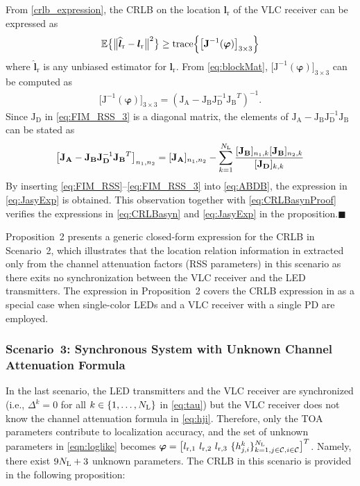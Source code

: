 \documentclass[10pt,twocolumn]{IEEEtran}
\newcommand{\NL}{N_{\rm{L}}}
\newcommand{\bvp}{{\boldsymbol{\varphi}}}
\newcommand{\mtC}{{\mathcal{C}}}
\newcommand{\expectation}{{\mathbb{E}}}
\newcommand{\lr}{{\boldsymbol{l}_{\mathrm{r}}}}
\newcommand{\lrh}{{\widehat{\boldsymbol{l}}_{\mathrm{r}}}}
\newcommand{\lrs}[1]{{l_{\mathrm{r},#1}}}
\newcommand{\Jvi}{{\boldsymbol{\mathrm{J}}^{-1}(\bvp)}}
\newcommand{\JA}{{\boldsymbol{\mathrm{J_A}}}}
\newcommand{\JB}{{\boldsymbol{\mathrm{J_B}}}}
\newcommand{\JD}{{\boldsymbol{\mathrm{J_D}}}}
\newcommand{\JDi}{{\boldsymbol{\mathrm{J}}}_{\boldsymbol{\mathrm{D}}}^{-1}}
\begin{document}
From \eqref{crlb_expression}, the CRLB on the location $\lr$ of the VLC receiver can be expressed as \cite{Poor}
\begin{gather}\label{eq:CRLBasynProof}
	\expectation \big\{ \big\|\lrh - \lr \big\|^2 \big\}\geq{\rm{trace}}\Big\{\big[\Jvi\big]_{3\times3}\Big\}
\end{gather}
where $\lrh$ is any unbiased estimator for $\lr$. From \eqref{eq:blockMat}, $\big[\Jvi\big]_{3\times3}$ can be computed as
\begin{gather}\label{eq:blockInv}
	\big[\Jvi\big]_{3\times3}=\left(\JA-\JB\JDi\JB^T\right)^{-1}.
\end{gather}
Since $\JD$ in \eqref{eq:FIM_RSS_3} is a diagonal matrix, the elements of $\JA-\JB\JDi\JB$ can be stated as
\begin{gather}\label{eq:ABDB}	\big[\JA-\JB\JDi\JB^T\big]_{n_1,n_2}=[\JA]_{n_1,n_2}-\sum_{k=1}^{\NL}\frac{[\JB]_{n_1,k}[\JB]_{n_2,k}}{[\JD]_{k,k}}
\end{gather}
By inserting \eqref{eq:FIM_RSS}--\eqref{eq:FIM_RSS_3} into \eqref{eq:ABDB}, the expression in \eqref{eq:JasyExp} is obtained. This observation together with \eqref{eq:CRLBasynProof} verifies the expressions in \eqref{eq:CRLBasyn} and \eqref{eq:JasyExp} in the proposition.\hfill$\blacksquare$

Proposition~2 presents a generic closed-form expression for the CRLB in Scenario~2, which illustrates that the location relation information in extracted only from the channel attenuation factors (RSS parameters) in this scenario as there exits no synchronization between the VLC receiver and the LED transmitters. The expression in Proposition~2 covers the CRLB expression in \cite[Prop.~3]{Direct_TCOM} as a special case when single-color LEDs and a VLC receiver with a single PD are employed.


\subsubsection{Scenario~3: Synchronous System with Unknown Channel Attenuation Formula}\label{sec:Case3pos}

In the last scenario, the LED transmitters and the VLC receiver are synchronized (i.e., $\Delta^k=0$ for all $k\in\{1,\ldots,\NL\}$ in \eqref{eq:tau}) but the VLC receiver does not know the channel attenuation formula in \eqref{eq:hji}. Therefore, only the TOA parameters contribute to localization accuracy, and the set of unknown parameters in \eqref{eqn:loglike} becomes $\bvp=\big[\lrs{1}~\lrs{2}~\lrs{3}~\{h^k_{j,i}\}_{k=1,j\in{\mtC},i\in{\mtC}}^{\NL}\big]^T$. Namely, there exist $9\NL+3$ unknown parameters. The CRLB in this scenario is provided in the following proposition:
\end{document}

